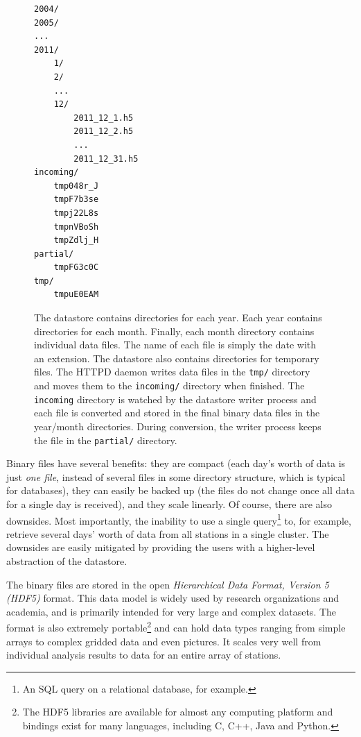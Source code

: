 \begin{figure}
\begin{minipage}{.45\linewidth}
\centering
\begin{minipage}{125pt}
\begin{verbatim}
2004/
2005/
...
2011/
    1/
    2/
    ...
    12/
        2011_12_1.h5
        2011_12_2.h5
        ...
        2011_12_31.h5
incoming/
    tmp048r_J
    tmpF7b3se
    tmpj22L8s
    tmpnVBoSh
    tmpZdlj_H
partial/
    tmpFG3c0C
tmp/
    tmpuE0EAM
\end{verbatim}
\end{minipage}
\end{minipage}
\caption{  The datastore
contains directories for each year.  Each year contains directories for each
month.  Finally, each month directory contains individual data files.  The name
of each file is simply the date with an extension.  The datastore also contains
directories for temporary files.  The HTTPD daemon writes data files in the
\texttt{tmp/} directory and moves them to the \texttt{incoming/} directory when
finished.  The \texttt{incoming} directory is watched by the datastore writer
process and each file is converted and stored in the final binary data files in
the year/month directories.  During conversion, the writer process keeps the
file in the \texttt{partial/} directory.}
\label{fig:datastore-dir-structure}
\end{figure}

Binary files have several benefits: they are compact (each day's worth of data
is just \emph{one file}, instead of several files in some directory structure,
which is typical for databases), they can easily be backed up (the files do not
change once all data for a single day is received), and they scale linearly.  Of
course, there are also downsides.  Most importantly, the inability to use a
single query\footnote{An SQL query on a relational database, for example.} to,
for example, retrieve several days' worth of data from all stations in a single
cluster.  The downsides are easily mitigated by providing the users with a
higher-level abstraction of the datastore.

The binary files are stored in the open \emph{Hierarchical Data Format, Version
5 (HDF5)} format. This data model is widely used by research organizations and
academia, and is primarily intended for very large and complex datasets.  The
format is also extremely portable\footnote{The HDF5 libraries are available for
almost any computing platform and bindings exist for many languages, including
C, C++, Java and Python.} and can hold data types ranging from simple arrays to
complex gridded data and even pictures. It scales very well from individual
analysis results to data for an entire array of stations.

